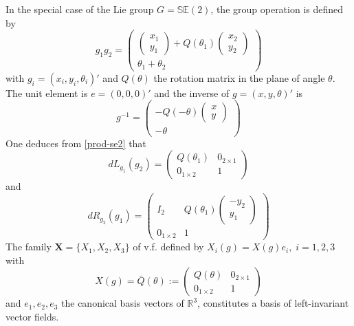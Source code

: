 \documentclass[a4paper,twoside]{article}
\def \RR {{\mathbb R}}
\def \bx {{\mathbf X}}
\def \SE {{\mathbb S}{\mathbb E}}
\begin{document}
In the special case of the Lie group $G= \SE(2)$, the group operation is defined by
\begin{equation} 
\label{prod-se2}
g_1 g_2 = \begin{pmatrix} \begin{pmatrix} x_1\\y_1 \end{pmatrix} 
+Q(\theta_1) \begin{pmatrix} x_2 \\ y_2 \end{pmatrix} \\ \theta_1+\theta_2 
\end{pmatrix}
\end{equation}
with $g_i=(x_i,y_i,\theta_i)'$ and $Q(\theta)$ the rotation matrix in the plane 
of angle $\theta$. The unit element is $e=(0,0,0)'$ and the inverse of 
$g=(x,y,\theta)'$ is
\begin{equation} 
\label{inv-se2}
g^{-1} = \begin{pmatrix}
-Q(-\theta) \begin{pmatrix}
x \\
y 
\end{pmatrix} \\
-\theta
\end{pmatrix}
\end{equation}
One deduces from \eqref{prod-se2} that
\begin{equation}
\label{dlse2}
dL_{g_1}(g_2)= \begin{pmatrix}
Q(\theta_1) & 0_{2\times1} \\
0_{1\times2} & 1
\end{pmatrix}
\end{equation}
and
\begin{equation}
\label{drse2} 
dR_{g_2}(g_1) = \begin{pmatrix}
I_2 & Q(\theta_1) \begin{pmatrix} -y_2 \\ y_1 \end{pmatrix} \\
0_{1\times2} & 1
\end{pmatrix}
\end{equation}
The family $\bx=\{X_1,X_2,X_3\}$ of v.f. defined by $X_i(g) = X(g) e_i,  \; i =1,2,3$ with
\begin{equation}
\label{xg-se2}
X(g) = \bar Q(\theta):= \begin{pmatrix}
Q(\theta) & 0_{2\times1}  \\
0_{1 \times 2} & 1
\end{pmatrix}
\end{equation}
and $e_1,e_2,e_3$ the canonical basis vectors of $\RR^3$, constitutes a basis of left-invariant vector fields. 
\end{document}
